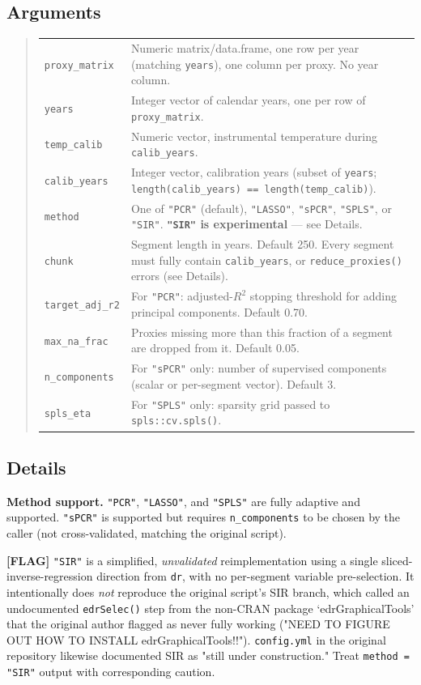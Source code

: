 \documentclass[10pt]{article}
\newcommand{\flag}[1]{\textcolor{gaporange}{\textbf{[FLAG]} #1}}
\newcommand{\rdsub}[1]{\subsection*{#1}}
\begin{document}
\rdsub{Arguments}
\begin{quote}
\begin{tabular}{@{}p{3.2cm}p{10.8cm}@{}}
\texttt{proxy\_matrix} & Numeric matrix/data.frame, one row per year (matching \texttt{years}), one column per proxy. No year column. \\[0.3em]
\texttt{years} & Integer vector of calendar years, one per row of \texttt{proxy\_matrix}. \\[0.3em]
\texttt{temp\_calib} & Numeric vector, instrumental temperature during \texttt{calib\_years}. \\[0.3em]
\texttt{calib\_years} & Integer vector, calibration years (subset of \texttt{years}; \texttt{length(calib\_years) == length(temp\_calib)}). \\[0.3em]
\texttt{method} & One of \texttt{"PCR"} (default), \texttt{"LASSO"}, \texttt{"sPCR"}, \texttt{"SPLS"}, or \texttt{"SIR"}. \textbf{\texttt{"SIR"} is experimental} --- see Details. \\[0.3em]
\texttt{chunk} & Segment length in years. Default 250. Every segment must fully contain \texttt{calib\_years}, or \texttt{reduce\_proxies()} errors (see Details). \\[0.3em]
\texttt{target\_adj\_r2} & For \texttt{"PCR"}: adjusted-$R^2$ stopping threshold for adding principal components. Default 0.70. \\[0.3em]
\texttt{max\_na\_frac} & Proxies missing more than this fraction of a segment are dropped from it. Default 0.05. \\[0.3em]
\texttt{n\_components} & For \texttt{"sPCR"} only: number of supervised components (scalar or per-segment vector). Default 3. \\[0.3em]
\texttt{spls\_eta} & For \texttt{"SPLS"} only: sparsity grid passed to \texttt{spls::cv.spls()}. \\
\end{tabular}
\end{quote}

\rdsub{Details}
\textbf{Method support.} \texttt{"PCR"}, \texttt{"LASSO"}, and \texttt{"SPLS"}
are fully adaptive and supported. \texttt{"sPCR"} is supported but requires
\texttt{n\_components} to be chosen by the caller (not cross-validated,
matching the original script).

\flag{\texttt{"SIR"} is a simplified, \emph{unvalidated} reimplementation
using a single sliced-inverse-regression direction from \texttt{dr}, with
no per-segment variable pre-selection. It intentionally does \emph{not}
reproduce the original script's SIR branch, which called an undocumented
\texttt{edrSelec()} step from the non-CRAN package `edrGraphicalTools' that
the original author flagged as never fully working ("NEED TO FIGURE OUT HOW
TO INSTALL edrGraphicalTools!!"). \texttt{config.yml} in the original
repository likewise documented SIR as "still under construction." Treat
\texttt{method = "SIR"} output with corresponding caution.}
\end{document}
